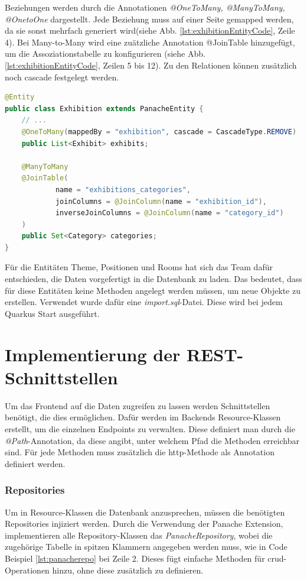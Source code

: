 Beziehungen werden durch die Annotationen \emph{@OneToMany, @ManyToMany, @OnetoOne} dargestellt. 
Jede Beziehung muss auf einer Seite gemapped werden, da sie sonst mehrfach generiert wird(siehe Abb. \ref{lst:exhibitionEntityCode}, Zeile 4). 
Bei Many-to-Many wird eine zuätzliche Annotation @JoinTable hinzugefügt, um die Assoziationstabelle zu konfigurieren (siehe Abb. \ref{lst:exhibitionEntityCode}, Zeilen 5 bis 12). 
Zu den Relationen können zusätzlich noch \gls{cascade} festgelegt werden. 

\begin{lstlisting}[label=lst:exhibitionEntityCode, language=java]
@Entity
public class Exhibition extends PanacheEntity {
    // ...
    @OneToMany(mappedBy = "exhibition", cascade = CascadeType.REMOVE)
    public List<Exhibit> exhibits;

    @ManyToMany
    @JoinTable(
            name = "exhibitions_categories",
            joinColumns = @JoinColumn(name = "exhibition_id"),
            inverseJoinColumns = @JoinColumn(name = "category_id")
    )
    public Set<Category> categories;
}
\end{lstlisting}

Für die Entitäten Theme, Positionen und Rooms hat sich das Team dafür entschieden, die Daten vorgefertigt in die Datenbank zu laden. 
Das bedeutet, dass für diese Entitäten keine Methoden angelegt werden müssen, um neue Objekte zu erstellen. 
Verwendet wurde dafür eine \emph{import.sql}-Datei. 
Diese wird bei jedem Quarkus Start ausgeführt. 

\section{Implementierung der REST-Schnittstellen}

Um das Frontend auf die Daten zugreifen zu lassen werden Schnittstellen benötigt, die dies ermöglichen. 
Dafür werden im Backends Resource-Klassen erstellt, um die einzelnen Endpoints zu verwalten. 
Diese definiert man durch die \emph{@Path}-Annotation, da diese angibt, unter welchem Pfad die Methoden erreichbar sind. 
Für jede Methoden muss zusätzlich die \gls{http}-Methode als Annotation definiert werden. 

\subsubsection{Repositories} 
Um in Resource-Klassen die Datenbank anzusprechen, müssen die benötigten Repositories injiziert werden. 
Durch die Verwendung der Panache Extension, implementieren alle Repository-Klassen das \emph{PanacheRepository}, wobei die zugehörige Tabelle in spitzen Klammern angegeben werden muss, wie in Code Beispiel \ref{lst:panacherepo} bei Zeile 2.
Dieses fügt einfache Methoden für \gls{crud}-Operationen hinzu, ohne diese zusätzlich zu definieren. 

